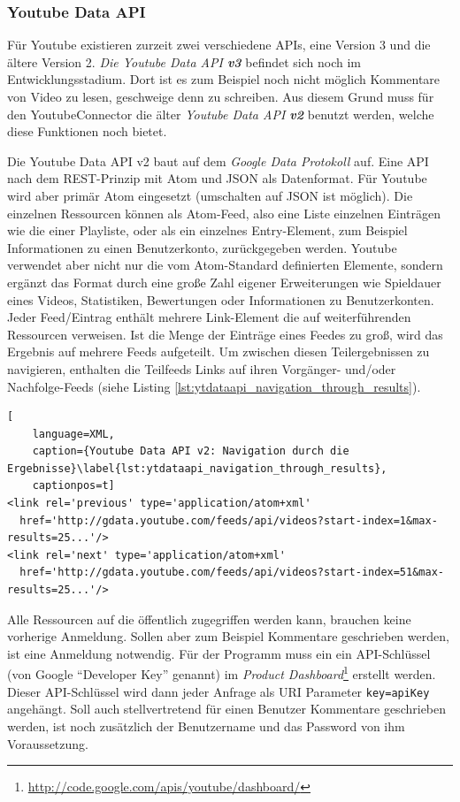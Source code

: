 \subsubsection{Youtube Data API} %
\label{ssub:youtube_data_api}

Für Youtube existieren zurzeit zwei verschiedene APIs, eine Version 3 und die ältere Version 2. \emph{Die Youtube Data API \textbf{v3}} befindet sich noch im Entwicklungsstadium. Dort ist es zum Beispiel noch nicht möglich Kommentare von Video zu lesen, geschweige denn zu schreiben. Aus diesem Grund muss für den YoutubeConnector die älter \emph{Youtube Data API \textbf{v2}} benutzt werden, welche diese Funktionen noch bietet. 

Die Youtube Data API v2 baut auf dem \emph{Google Data Protokoll} auf. Eine API nach dem REST-Prinzip mit Atom und JSON als Datenformat. Für Youtube wird aber primär Atom eingesetzt (umschalten auf JSON ist möglich). Die einzelnen Ressourcen können als Atom-Feed, also eine Liste einzelnen Einträgen wie die einer Playliste, oder als ein einzelnes Entry-Element, zum Beispiel Informationen zu einen Benutzerkonto, zurückgegeben werden. Youtube verwendet aber nicht nur die vom Atom-Standard definierten Elemente, sondern ergänzt das Format durch eine große Zahl eigener Erweiterungen wie Spieldauer eines Videos, Statistiken, Bewertungen oder Informationen zu Benutzerkonten. Jeder Feed/Eintrag enthält mehrere Link-Element die auf weiterführenden Ressourcen verweisen. Ist die Menge der Einträge eines Feedes zu groß, wird das Ergebnis auf mehrere Feeds aufgeteilt. Um zwischen diesen Teilergebnissen zu navigieren, enthalten die Teilfeeds Links auf ihren Vorgänger- und/oder Nachfolge-Feeds (siehe Listing \ref{lst:ytdataapi_navigation_through_results}).

\begin{lstlisting}[
    language=XML,
    caption={Youtube Data API v2: Navigation durch die Ergebnisse}\label{lst:ytdataapi_navigation_through_results},
    captionpos=t]
<link rel='previous' type='application/atom+xml'
  href='http://gdata.youtube.com/feeds/api/videos?start-index=1&max-results=25...'/>
<link rel='next' type='application/atom+xml'
  href='http://gdata.youtube.com/feeds/api/videos?start-index=51&max-results=25...'/>
\end{lstlisting}

Alle Ressourcen auf die öffentlich zugegriffen werden kann, brauchen keine vorherige Anmeldung. Sollen aber zum Beispiel Kommentare geschrieben werden, ist eine Anmeldung notwendig. Für der Programm muss ein ein API-Schlüssel (von Google \enquote{Developer Key} genannt) im \emph{Product Dashboard}\footnote{\url{http://code.google.com/apis/youtube/dashboard/}} erstellt werden. Dieser API-Schlüssel wird dann jeder Anfrage als URI Parameter \texttt{key={apiKey}} angehängt. Soll auch stellvertretend für einen Benutzer Kommentare geschrieben werden, ist noch zusätzlich der Benutzername und das Password von ihm Voraussetzung.

